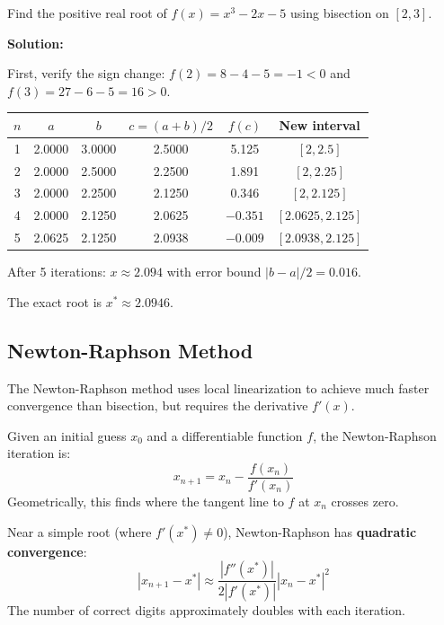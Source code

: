 \begin{examplebox}[title=Example 11.1: Bisection Method for Finding a Closed-Loop Pole]
Find the positive real root of $f(x) = x^3 - 2x - 5$ using bisection on $[2, 3]$.

\textbf{Solution:}

First, verify the sign change: $f(2) = 8 - 4 - 5 = -1 < 0$ and $f(3) = 27 - 6 - 5 = 16 > 0$. \checkmark

\begin{center}
\begin{tabular}{cccccc}
\toprule
$n$ & $a$ & $b$ & $c = (a+b)/2$ & $f(c)$ & New interval \\
\midrule
1 & 2.0000 & 3.0000 & 2.5000 & 5.125 & $[2, 2.5]$ \\
2 & 2.0000 & 2.5000 & 2.2500 & 1.891 & $[2, 2.25]$ \\
3 & 2.0000 & 2.2500 & 2.1250 & 0.346 & $[2, 2.125]$ \\
4 & 2.0000 & 2.1250 & 2.0625 & $-0.351$ & $[2.0625, 2.125]$ \\
5 & 2.0625 & 2.1250 & 2.0938 & $-0.009$ & $[2.0938, 2.125]$ \\
\bottomrule
\end{tabular}
\end{center}

After 5 iterations: $x \approx 2.094$ with error bound $|b-a|/2 = 0.016$.

The exact root is $x^* \approx 2.0946$.
\end{examplebox}

\subsection{Newton-Raphson Method}

The Newton-Raphson method uses local linearization to achieve much faster convergence than bisection, but requires the derivative $f'(x)$.

\begin{definitionbox}[title=Definition 11.5: Newton-Raphson Method]
Given an initial guess $x_0$ and a differentiable function $f$, the Newton-Raphson iteration is:
\begin{equation}
\boxed{x_{n+1} = x_n - \frac{f(x_n)}{f'(x_n)}}
\end{equation}
Geometrically, this finds where the tangent line to $f$ at $x_n$ crosses zero.
\end{definitionbox}

\begin{keyconceptbox}[title=Newton-Raphson Convergence]
Near a simple root (where $f'(x^*) \neq 0$), Newton-Raphson has \textbf{quadratic convergence}:
\begin{equation}
|x_{n+1} - x^*| \approx \frac{|f''(x^*)|}{2|f'(x^*)|} |x_n - x^*|^2
\end{equation}
The number of correct digits approximately doubles with each iteration.
\end{keyconceptbox}

